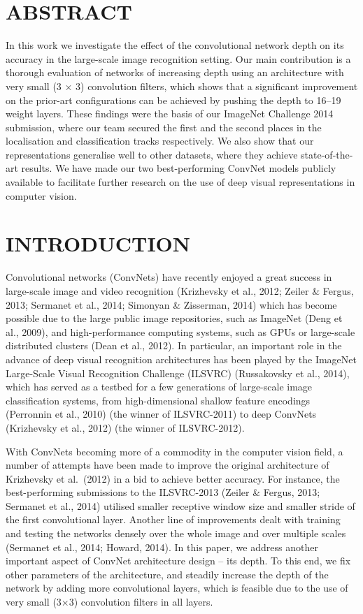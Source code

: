 \documentclass[12pt,a4paper,UTF8,twoside]{book}
\begin{document}
\hypertarget{abstract}{%
\section{ABSTRACT}\label{abstract}}

In this work we investigate the effect of the convolutional network depth on its accuracy in the large-scale image recognition setting. Our main contribution is a thorough evaluation of networks of increasing depth using an architecture with very small (3 × 3) convolution filters, which shows that a significant improvement on the prior-art configurations can be achieved by pushing the depth to 16--19 weight layers. These findings were the basis of our ImageNet Challenge 2014 submission, where our team secured the first and the second places in the localisation and classification tracks respectively. We also show that our representations generalise well to other datasets, where they achieve state-of-the-art results. We have made our two best-performing ConvNet models publicly available to facilitate further research on the use of deep visual representations in computer vision.

\hypertarget{introduction}{%
\section{INTRODUCTION}\label{introduction}}

Convolutional networks (ConvNets) have recently enjoyed a great success in large-scale image and video recognition (Krizhevsky et al., 2012; Zeiler \& Fergus, 2013; Sermanet et al., 2014; Simonyan \& Zisserman, 2014) which has become possible due to the large public image repositories, such as ImageNet (Deng et al., 2009), and high-performance computing systems, such as GPUs or large-scale distributed clusters (Dean et al., 2012). In particular, an important role in the advance of deep visual recognition architectures has been played by the ImageNet Large-Scale Visual Recognition Challenge (ILSVRC) (Russakovsky et al., 2014), which has served as a testbed for a few generations of large-scale image classification systems, from high-dimensional shallow feature encodings (Perronnin et al., 2010) (the winner of ILSVRC-2011) to deep ConvNets (Krizhevsky et al., 2012) (the winner of ILSVRC-2012).

With ConvNets becoming more of a commodity in the computer vision field, a number of attempts have been made to improve the original architecture of Krizhevsky et al.~(2012) in a bid to achieve better accuracy. For instance, the best-performing submissions to the ILSVRC-2013 (Zeiler \& Fergus, 2013; Sermanet et al., 2014) utilised smaller receptive window size and smaller stride of the first convolutional layer. Another line of improvements dealt with training and testing the networks densely over the whole image and over multiple scales (Sermanet et al., 2014; Howard, 2014). In this paper, we address another important aspect of ConvNet architecture design -- its depth. To this end, we fix other parameters of the architecture, and steadily increase the depth of the network by adding more convolutional layers, which is feasible due to the use of very small (3×3) convolution filters in all layers.
\end{document}
